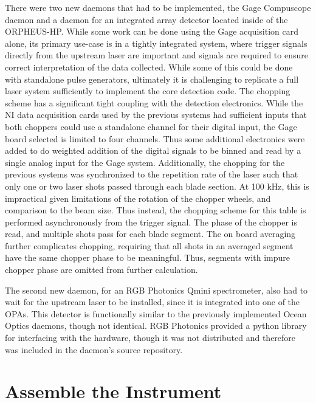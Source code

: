 There were two new daemons that had to be implemented, the Gage Compuscope daemon and a daemon for an integrated array detector located inside of the ORPHEUS-HP.
While some work can be done using the Gage acquisition card alone, its primary use-case is in a tightly integrated system, where trigger signals directly from the upstream laser are important and signals are required to ensure correct interpretation of the data collected.
While some of this could be done with standalone pulse generators, ultimately it is challenging to replicate a full laser system sufficiently to implement the core detection code.
The chopping scheme has a significant tight coupling with the detection electronics.
While the NI data acquisition cards used by the previous systems had sufficient inputs that both choppers could use a standalone channel for their digital input, the Gage board selected is limited to four channels.
Thus some additional electronics were added to do weighted addition of the digital signals to be binned and read by a single analog input for the Gage system.
Additionally, the chopping for the previous systems was synchronized to the repetition rate of the laser such that only one or two laser shots passed through each blade section.
At 100 kHz, this is impractical given limitations of the rotation of the chopper wheels, and comparison to the beam size.
Thus instead, the chopping scheme for this table is performed asynchronously from the trigger signal.
The phase of the chopper is read, and multiple shots pass for each blade segment.
The on board averaging further complicates chopping, requiring that all shots in an averaged segment have the same chopper phase to be meaningful.
Thus, segments with impure chopper phase are omitted from further calculation.


The second new daemon, for an RGB Photonics Qmini spectrometer\cite{broadcom_qmini}, also had to wait for the upstream laser to be installed, since it is integrated into one of the OPAs.
This detector is functionally similar to the previously implemented Ocean Optics daemons\cite{yaqd-ocean-optics}, though not identical.
RGB Photonics provided a python library for interfacing with the hardware, though it was not distributed and therefore was included in the daemon's source repository.

\clearpage

\section{Assemble the Instrument}  %

